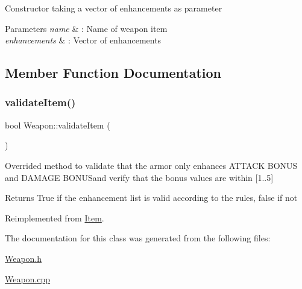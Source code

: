 Constructor taking a vector of enhancements as parameter 
\begin{DoxyParams}{Parameters}
{\em name} & \+: Name of weapon item \\
\hline
{\em enhancements} & \+: Vector of enhancements \\
\hline
\end{DoxyParams}


\subsection{Member Function Documentation}
\hypertarget{class_weapon_afa7ce016c3cba686399cbe57628f8c70}{}\label{class_weapon_afa7ce016c3cba686399cbe57628f8c70} 
\subsubsection{\texorpdfstring{validate\+Item()}{validateItem()}}
{\footnotesize\ttfamily bool Weapon\+::validate\+Item (\begin{DoxyParamCaption}{ }\end{DoxyParamCaption})\hspace{0.3cm}{\ttfamily [virtual]}}

Overrided method to validate that the armor only enhances \textquotesingle{}A\+T\+T\+A\+CK B\+O\+N\+US\textquotesingle{} and \textquotesingle{}D\+A\+M\+A\+GE B\+O\+N\+US\textquotesingle{}and verify that the bonus values are within \mbox{[}1..5\mbox{]} \begin{DoxyReturn}{Returns}
True if the enhancement list is valid according to the rules, false if not 
\end{DoxyReturn}


Reimplemented from \hyperlink{class_item_a6603371b60aaded48f697975c81fc25b}{Item}.



The documentation for this class was generated from the following files\+:\begin{DoxyCompactItemize}
\item 
\hyperlink{_weapon_8h}{Weapon.\+h}\item 
\hyperlink{_weapon_8cpp}{Weapon.\+cpp}\end{DoxyCompactItemize}
